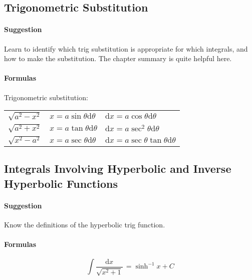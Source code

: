\documentclass[11pt]{article}
\begin{document}
				\pagebreak
				
	\subsection{Trigonometric Substitution}
		\paragraph{Suggestion} Learn to identify which trig substitution is appropriate for which integrals, and how to make the substitution. The chapter summary is quite helpful here.
		\paragraph{Formulas} Trigonometric substitution: 
			\begin{table}[h]
			\begin{center}
				\begin{tabularx}{1\textwidth}{X X X}
				$ \sqrt{a^2 - x^2} $ & $ x = a\sin \theta\mathrm{d}\theta $ & $ \mathrm{d}x = a \cos\theta\mathrm{d}\theta  $ \\ 
				$ \sqrt{a^2 + x^2} $ & $ x = a\tan \theta\mathrm{d}\theta $ & $ \mathrm{d}x = a \sec^2\theta\mathrm{d}\theta $ \\
				$ \sqrt{x^2 - a^2} $ & $ x = a\sec \theta\mathrm{d}\theta $ & $ \mathrm{d}x = a \sec\theta\tan\theta\mathrm{d}\theta  $ \\
				\end{tabularx}
			\label{ }
			\end{center}
			\end{table}
			
	\subsection{Integrals Involving Hyperbolic and Inverse Hyperbolic Functions}
		\paragraph{Suggestion} Know the definitions of the hyperbolic trig function.
		\paragraph{Formulas} 
					
			\begin{equation*}
				\int \! \frac{\mathrm{d}x}{\sqrt{x^2 + 1}} \, = \sinh^{-1}x + C 
			\end{equation*}
			
\end{document}

